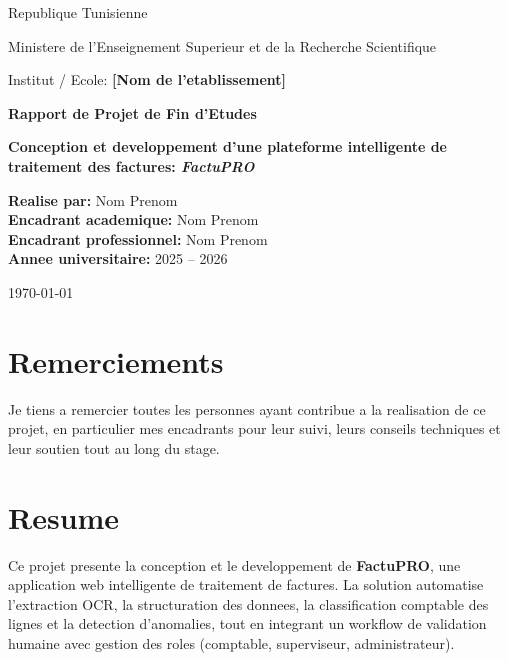 \documentclass[12pt,a4paper]{report}
\begin{document}
\begin{titlepage}
    \centering
    {\Large Republique Tunisienne\par}
    \vspace{0.3cm}
    {\large Ministere de l'Enseignement Superieur et de la Recherche Scientifique\par}
    \vspace{0.8cm}
    {\large Institut / Ecole: \textbf{[Nom de l'etablissement]}\par}
    \vspace{1.5cm}

    {\Huge\bfseries Rapport de Projet de Fin d'Etudes\par}
    \vspace{1cm}
    {\Large\bfseries Conception et developpement d'une plateforme intelligente de traitement des factures: \textit{FactuPRO}\par}
    \vspace{1.2cm}

    \begin{flushleft}
        \textbf{Realise par:} Nom Prenom \\
        \textbf{Encadrant academique:} Nom Prenom \\
        \textbf{Encadrant professionnel:} Nom Prenom \\
        \textbf{Annee universitaire:} 2025 -- 2026
    \end{flushleft}

    \vfill
    {\large \today\par}
\end{titlepage}

\chapter*{Remerciements}
Je tiens a remercier toutes les personnes ayant contribue a la realisation de ce projet, en particulier mes encadrants pour leur suivi, leurs conseils techniques et leur soutien tout au long du stage.

\chapter*{Resume}
Ce projet presente la conception et le developpement de \textbf{FactuPRO}, une application web intelligente de traitement de factures. La solution automatise l'extraction OCR, la structuration des donnees, la classification comptable des lignes et la detection d'anomalies, tout en integrant un workflow de validation humaine avec gestion des roles (comptable, superviseur, administrateur). \\
\end{document}

